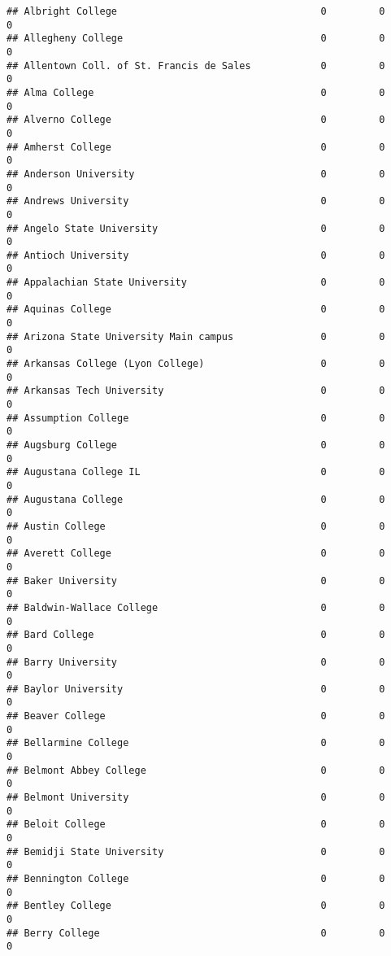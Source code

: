 \documentclass[
]{article}
\begin{document}
\begin{verbatim}
## Albright College                                   0         0         0
## Allegheny College                                  0         0         0
## Allentown Coll. of St. Francis de Sales            0         0         0
## Alma College                                       0         0         0
## Alverno College                                    0         0         0
## Amherst College                                    0         0         0
## Anderson University                                0         0         0
## Andrews University                                 0         0         0
## Angelo State University                            0         0         0
## Antioch University                                 0         0         0
## Appalachian State University                       0         0         0
## Aquinas College                                    0         0         0
## Arizona State University Main campus               0         0         0
## Arkansas College (Lyon College)                    0         0         0
## Arkansas Tech University                           0         0         0
## Assumption College                                 0         0         0
## Augsburg College                                   0         0         0
## Augustana College IL                               0         0         0
## Augustana College                                  0         0         0
## Austin College                                     0         0         0
## Averett College                                    0         0         0
## Baker University                                   0         0         0
## Baldwin-Wallace College                            0         0         0
## Bard College                                       0         0         0
## Barry University                                   0         0         0
## Baylor University                                  0         0         0
## Beaver College                                     0         0         0
## Bellarmine College                                 0         0         0
## Belmont Abbey College                              0         0         0
## Belmont University                                 0         0         0
## Beloit College                                     0         0         0
## Bemidji State University                           0         0         0
## Bennington College                                 0         0         0
## Bentley College                                    0         0         0
## Berry College                                      0         0         0

\end{verbatim}
\end{document}
